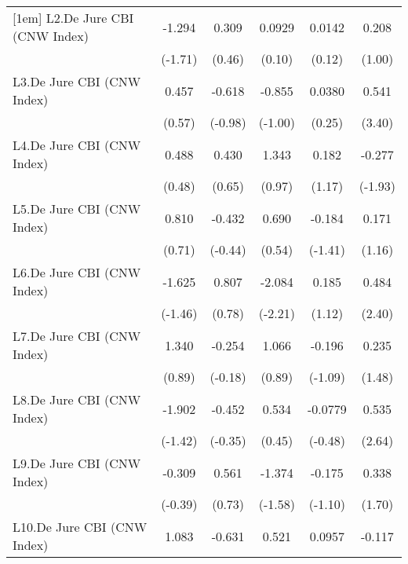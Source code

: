 {\begin{longtable}{l*{5}{c}}
[1em]
L2.De Jure CBI (CNW Index)&   -1.294         &    0.309         &   0.0929         &   0.0142         &    0.208         \\
                &  (-1.71)         &   (0.46)         &   (0.10)         &   (0.12)         &   (1.00)         \\
[1em]
L3.De Jure CBI (CNW Index)&    0.457         &   -0.618         &   -0.855         &   0.0380         &    0.541\sym{***}\\
                &   (0.57)         &  (-0.98)         &  (-1.00)         &   (0.25)         &   (3.40)         \\
[1em]
L4.De Jure CBI (CNW Index)&    0.488         &    0.430         &    1.343         &    0.182         &   -0.277         \\
                &   (0.48)         &   (0.65)         &   (0.97)         &   (1.17)         &  (-1.93)         \\
[1em]
L5.De Jure CBI (CNW Index)&    0.810         &   -0.432         &    0.690         &   -0.184         &    0.171         \\
                &   (0.71)         &  (-0.44)         &   (0.54)         &  (-1.41)         &   (1.16)         \\
[1em]
L6.De Jure CBI (CNW Index)&   -1.625         &    0.807         &   -2.084\sym{*}  &    0.185         &    0.484\sym{*}  \\
                &  (-1.46)         &   (0.78)         &  (-2.21)         &   (1.12)         &   (2.40)         \\
[1em]
L7.De Jure CBI (CNW Index)&    1.340         &   -0.254         &    1.066         &   -0.196         &    0.235         \\
                &   (0.89)         &  (-0.18)         &   (0.89)         &  (-1.09)         &   (1.48)         \\
[1em]
L8.De Jure CBI (CNW Index)&   -1.902         &   -0.452         &    0.534         &  -0.0779         &    0.535\sym{**} \\
                &  (-1.42)         &  (-0.35)         &   (0.45)         &  (-0.48)         &   (2.64)         \\
[1em]
L9.De Jure CBI (CNW Index)&   -0.309         &    0.561         &   -1.374         &   -0.175         &    0.338         \\
                &  (-0.39)         &   (0.73)         &  (-1.58)         &  (-1.10)         &   (1.70)         \\
[1em]
L10.De Jure CBI (CNW Index)&    1.083         &   -0.631         &    0.521         &   0.0957         &   -0.117         \\

\end{longtable}}
